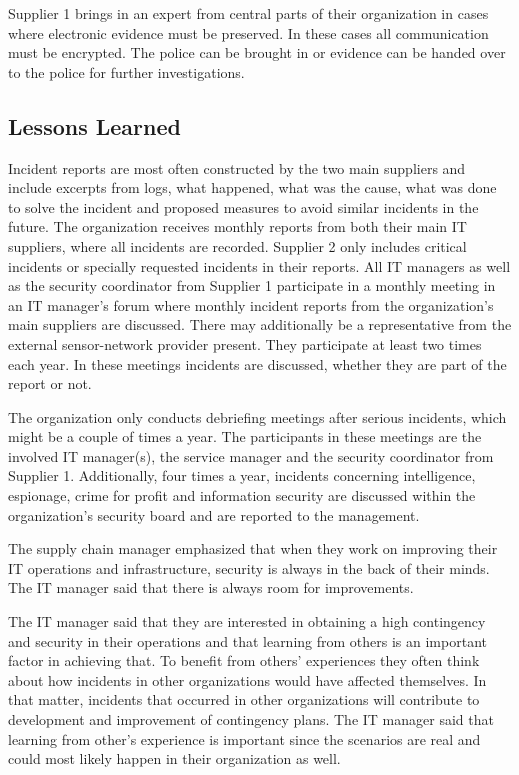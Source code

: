 Supplier 1 brings in an expert from central parts of their organization in cases where electronic evidence must be preserved. In these cases all communication must be encrypted. The police can be brought in or evidence can be handed over to the police for further investigations.

\subsection{Lessons Learned}
Incident reports are most often constructed by the two main suppliers and include excerpts from logs, what happened, what was the cause, what was done to solve the incident and proposed measures to avoid similar incidents in the future. The organization receives monthly reports from both their main IT suppliers, where all incidents are recorded. Supplier 2 only includes critical incidents or specially requested incidents in their reports. All IT managers as well as the security coordinator from Supplier 1 participate in a monthly meeting in an IT manager's forum where monthly incident reports from the organization's main suppliers are discussed. There may additionally be a representative from the external sensor-network provider present. They participate at least two times each year. In these meetings incidents are discussed, whether they are part of the report or not.

The organization only conducts debriefing meetings after serious incidents, which might be a couple of times a year. The participants in these meetings are the involved IT manager(s), the service manager and the security coordinator from Supplier 1. Additionally, four times a year, incidents concerning intelligence, espionage, crime for profit and information security are discussed within the organization's security board and are reported to the management. 

The supply chain manager emphasized that when they work on improving their IT operations and infrastructure, security is always in the back of their minds. The IT manager said that there is always room for improvements. 

The IT manager said that they are interested in obtaining a high contingency and security in their operations and that learning from others is an important factor in achieving that. To benefit from others' experiences they often think about how incidents in other organizations would have affected themselves. In that matter, incidents that occurred in other organizations will contribute to development and improvement of contingency plans. The IT manager said that learning from other's experience is important since the scenarios are real and could most likely happen in their organization as well.

